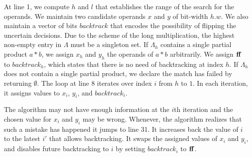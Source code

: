 At line 1, we compute $h$ and $l$ that establishes the range of the
search for the operands.
%
We maintain two candidate operands $x$ and $y$ of bit-width $h.w$.
%
We also maintain a vector of bits $backtrack$ that encodes 
the possibility of flipping the uncertain decisions.
%
Due to the scheme of the long multiplication, the highest
non-empty entry in $\Lambda$ must be a singleton set.
%
If $\Lambda_h$ contains a single partial product $a*b$,
we assign $x_h$ and $y_h$ the operands of $a*b$ arbitrarily.
%
We assign $\mathbf{ff}$ to $backtrack_h$, which states that there is no need of backtracking at index $h$.
%
If $\Lambda_h$ does not contain a single partial product,
we declare the match has failed by returning $\emptyset$.
%
The loop at line 8 iterates over index $i$ from $h$ to $1$.
%
In each iteration, it assigns values to $x_i$, $y_i$, and $backtrack_i$. 
%

The algorithm may not have enough information at the $i$th iteration
and the chosen value for $x_i$ and $y_i$ may be wrong.
%
Whenever, the algorithm realizes that such a mistake has happened
it jumps to line 31.
%
It increases back the value of $i$ to the latest $i'$ that allows
backtracking.
%
It swaps the assigned values of $x_i$ and $y_i$, and disables future
backtracking to $i$ by setting $backtrack_i$ to
$\mathbf{ff}$.
%

